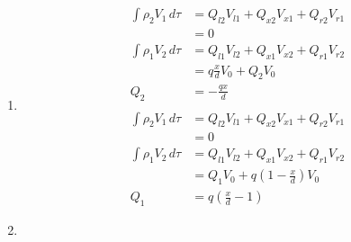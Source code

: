 \documentclass{article}
\begin{document}
\subsection{}

\begin{enumerate}
  \item

        \begin{align*}
          \int \rho_2 V_1 \,d \tau & = Q_{l 2} V_{l 1} + Q_{x 2} V_{x 1} + Q_{r 2} V_{r 1} \\
                                   & = 0                                                   \\
          \int \rho_1 V_2 \,d \tau & = Q_{l 1} V_{l 2} + Q_{x 1} V_{x 2} + Q_{r 1} V_{r 2} \\
                                   & = q \frac{x}{d} V_0 + Q_2 V_0                         \\
          Q_2                      & = -\frac{q x}{d}                                      \\ \\
          \int \rho_2 V_1 \,d \tau & = Q_{l 2} V_{l 1} + Q_{x 2} V_{x 1} + Q_{r 2} V_{r 1} \\
                                   & = 0                                                   \\
          \int \rho_1 V_2 \,d \tau & = Q_{l 1} V_{l 2} + Q_{x 1} V_{x 2} + Q_{r 1} V_{r 2} \\
                                   & = Q_1 V_0 + q \left( 1 - \frac{x}{d} \right) V_0      \\
          Q_1                      & = q \left( \frac{x}{d} - 1 \right)
        \end{align*}

  \item


\end{enumerate}
\end{document}
